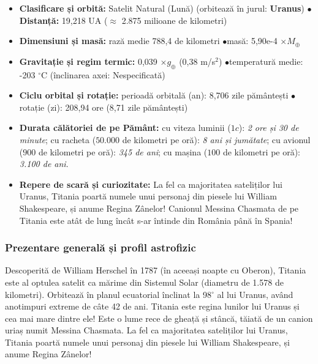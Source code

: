 \begin{tcolorbox}[orbitardata, title={\textbf{Repere esențiale: Titania}}]
\small
\begin{itemize}[leftmargin=1.4em, itemsep=2pt, topsep=2pt]
  \item \textbf{Clasificare și orbită:} Satelit Natural (Lună) (orbitează în jurul: \textbf{Uranus}) \quad$\bullet$\quad \textbf{Distanță:} 19,218 UA ($\approx$ 2.875 milioane de kilometri)
  \item \textbf{Dimensiuni și masă:} rază medie 788,4 de kilometri \quad$\bullet$\quad masă: 5,90e-4 $\times M_\oplus$
  \item \textbf{Gravitație și regim termic:} 0,039 $\times g_\oplus$ (0,38 m/s$^2$) \quad$\bullet$\quad temperatură medie: -203 $^\circ$C (înclinarea axei: Nespecificată)
  \item \textbf{Ciclu orbital și rotație:} perioadă orbitală (an): 8,706 zile pământești \quad$\bullet$\quad rotație (zi): 208,94 ore (8,71 zile pământești)
  \item \textbf{Durata călătoriei de pe Pământ:} cu viteza luminii ($1c$): \emph{2 ore și 30 de minute}; cu racheta ($50.000$ de kilometri pe oră): \emph{8 ani și jumătate}; cu avionul ($900$ de kilometri pe oră): \emph{345 de ani}; cu mașina ($100$ de kilometri pe oră): \emph{3.100 de ani}.
  \item \textbf{Repere de scară și curiozitate:} La fel ca majoritatea sateliților lui Uranus, Titania poartă numele unui personaj din piesele lui William Shakespeare, și anume Regina Zânelor! Canionul Messina Chasmata de pe Titania este atât de lung încât s-ar întinde din România până în Spania!
\end{itemize}
\end{tcolorbox}

\subsubsection*{Prezentare generală și profil astrofizic}
Descoperită de William Herschel în 1787 (în aceeași noapte cu Oberon), Titania este al optulea satelit ca mărime din Sistemul Solar (diametru de 1.578 de kilometri). Orbitează în planul ecuatorial înclinat la 98$^\circ$ al lui Uranus, având anotimpuri extreme de câte 42 de ani. Titania este regina lunilor lui Uranus și cea mai mare dintre ele! Este o lume rece de gheață și stâncă, tăiată de un canion uriaș numit Messina Chasmata. La fel ca majoritatea sateliților lui Uranus, Titania poartă numele unui personaj din piesele lui William Shakespeare, și anume Regina Zânelor!

